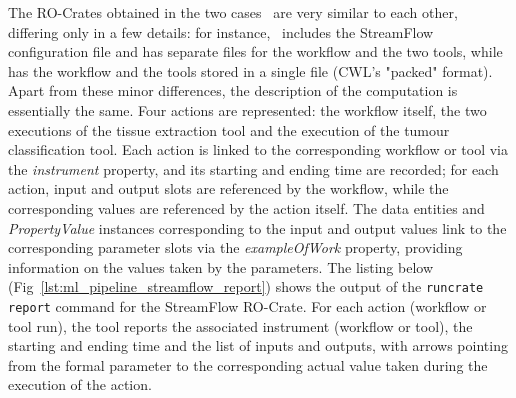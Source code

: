 \documentclass[10pt,letterpaper]{article}
\begin{document}
The RO-Crates obtained in the two cases~\cite{Colonnelli 2023, run-pathology}
are very similar to each other, differing only in a few details: for instance,~\cite{Colonnelli 2023} includes the StreamFlow configuration file and has separate files for the workflow and the two tools, while
\cite{run-pathology} has the workflow and the tools stored in a single file (CWL's "packed" format).
Apart from these minor differences, the description of the computation is essentially the same.
Four actions are represented: the workflow itself, the two executions of the tissue extraction tool and the execution of the tumour classification tool.
Each action is linked to the corresponding workflow or tool via the
\emph{instrument} property, and its starting and ending time are recorded; for each action, input and output slots are referenced by the workflow, while the corresponding values are referenced by the action itself.
The data entities and \emph{PropertyValue} instances corresponding to the input and output values link to the corresponding parameter slots via the \emph{exampleOfWork} property, providing information on the values taken by the parameters.
The listing below (Fig~\ref{lst:ml_pipeline_streamflow_report}) shows the output of the
\texttt{runcrate report} command for the StreamFlow RO-Crate. 
For each action (workflow or tool run), the tool reports the associated instrument (workflow or tool), the starting and ending time and the list of inputs and outputs, with arrows pointing from the formal parameter to the corresponding actual value taken during the execution of the action.
\end{document}
